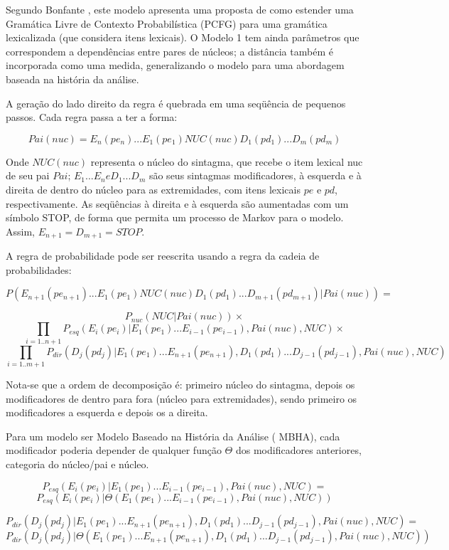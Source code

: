 Segundo Bonfante \cite{bonfante03}, este modelo apresenta uma proposta de como estender uma Gramática Livre de Contexto Probabilística (PCFG) para uma gramática lexicalizada (que considera itens lexicais). O Modelo 1 tem ainda parâmetros que correspondem a dependências entre pares de núcleos; a distância também é incorporada como uma medida, generalizando o modelo para uma abordagem baseada na história da análise.

A geração do lado direito da regra é quebrada em uma seqüência de pequenos passos. Cada regra passa a ter a forma:

$$Pai(nuc) = E_n(pe_n)...E_1(pe_1)NUC(nuc)D_1(pd_1)...D_m(pd_m)$$

Onde $NUC(nuc)$ representa o núcleo do sintagma, que recebe o item lexical nuc de seu pai $Pai$; $E_1...E_n e D_1...D_m$ são seus sintagmas modificadores, à esquerda e à direita de dentro do núcleo para as extremidades, com itens lexicais $pe$ e $pd$, respectivamente. As seqüências à direita e à esquerda são aumentadas com um símbolo STOP, de forma que permita um processo de Markov para o modelo. Assim, $ E_{n+1} = D_{m+1} = STOP $.

A regra de probabilidade pode ser reescrita usando a regra da cadeia de probabilidades:

$$P(E_{n+1}(pe_{n+1})...E_1(pe_1)NUC(nuc)D_1(pd_1)...D_{m+1}(pd_{m+1})|Pai(nuc)) = $$

$$P_{nuc}(NUC|Pai(nuc)) \times $$
$$\prod_{i=1..n+1} P_{esq}(E_i(pe_i)|E_1(pe_1)...E_{i-1}(pe_{i-1}), Pai(nuc),NUC) \times $$
$$\prod_{i=1..m+1} P_{dir}(D_j(pd_j)|E_1(pe_1)...E_{n+1}(pe_{n+1}),D_1(pd_1)...D_{j-1}(pd_{j-1}), Pai(nuc),NUC)  $$

Nota-se que a ordem de decomposição é: primeiro núcleo do sintagma, depois os modificadores de dentro para fora (núcleo para extremidades), sendo primeiro os modificadores a esquerda e depois os a direita.

Para um modelo ser Modelo Baseado na História da Análise ( MBHA), cada modificador poderia depender de qualquer função $\Theta$ dos modificadores anteriores, categoria do núcleo/pai e núcleo.

$$P_{esq}(E_i(pe_i)|E_1(pe_1)...E_{i-1}(pe_{i-1}), Pai(nuc),NUC) = $$
$$P_{esq}(E_i(pe_i)|\Theta(E_1(pe_1)...E_{i-1}(pe_{i-1}), Pai(nuc),NUC))$$

$$P_{dir}(D_j(pd_j)|E_1(pe_1)...E_{n+1}(pe_{n+1}),D_1(pd_1)...D_{j-1}(pd_{j-1}), Pai(nuc),NUC) = $$
$$P_{dir}(D_j(pd_j)|\Theta(E_1(pe_1)...E_{n+1}(pe_{n+1}),D_1(pd_1)...D_{j-1}(pd_{j-1}), Pai(nuc),NUC))$$


